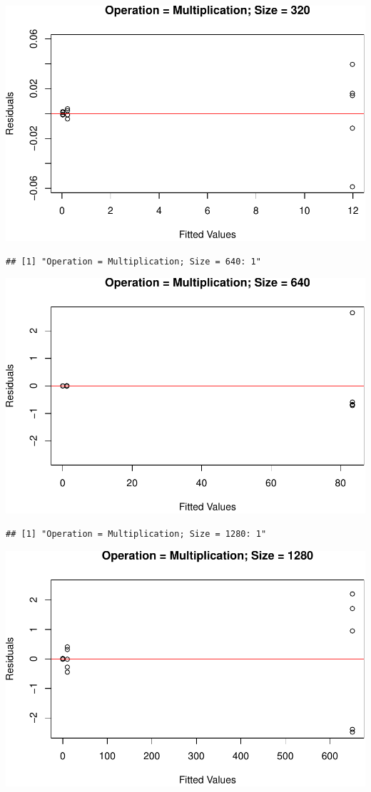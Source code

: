 \documentclass[
]{article}
\begin{document}
\includegraphics{main_files/figure-latex/unnamed-chunk-20-14.pdf}

\begin{verbatim}
## [1] "Operation = Multiplication; Size = 640: 1"
\end{verbatim}

\includegraphics{main_files/figure-latex/unnamed-chunk-20-15.pdf}

\begin{verbatim}
## [1] "Operation = Multiplication; Size = 1280: 1"
\end{verbatim}

\includegraphics{main_files/figure-latex/unnamed-chunk-20-16.pdf}
\end{document}
